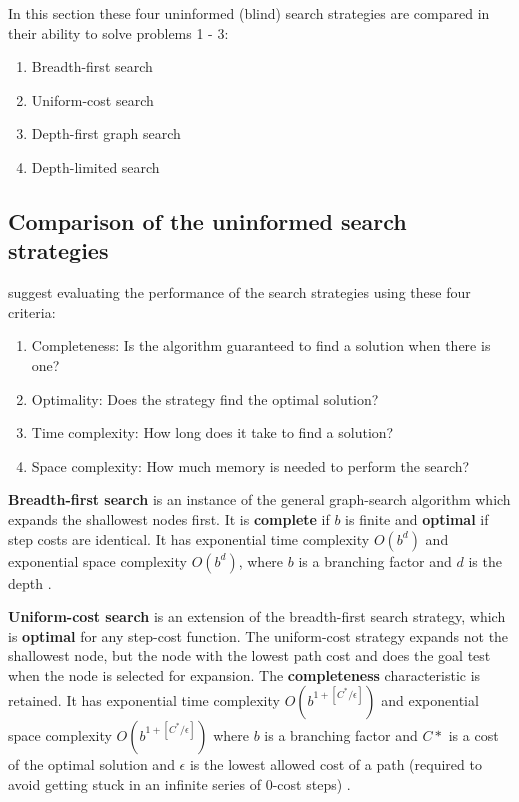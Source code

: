 \documentclass[11pt]{article}
\begin{document}
In this section these four uninformed (blind) search strategies are compared in their ability to solve problems 1 - 3:

\begin{enumerate}
  \item Breadth-first search
  \item Uniform-cost search
  \item Depth-first graph search
  \item Depth-limited search
\end{enumerate}

\subsection{Comparison of the uninformed search strategies}

\cite{russell2010artificial} suggest evaluating the performance of the search strategies using these four criteria:

\begin{enumerate}
  \item Completeness: Is the algorithm guaranteed to find a solution when there is one?
  \item Optimality: Does the strategy find the optimal solution?
  \item Time complexity: How long does it take to find a solution?
  \item Space complexity: How much memory is needed to perform the search?
\end{enumerate}

\textbf{Breadth-first search} is an instance of the general graph-search algorithm which expands the shallowest nodes first. It is \textbf{complete} if $b$ is finite and \textbf{optimal} if step costs are identical. It has exponential time complexity $O(b^d)$ and exponential space complexity $O(b^d)$, where $b$ is a branching factor and $d$ is the depth \autocite{russell2010artificial}.

\textbf{Uniform-cost search} is an extension of the breadth-first search strategy, which is \textbf{optimal} for any step-cost function. The uniform-cost strategy expands not the shallowest node, but the node with the lowest path cost and does the goal test when the node is selected for expansion. The \textbf{completeness} characteristic is retained. It has exponential time complexity $O(b^{1 + [C^* / \epsilon]})$ and exponential space complexity $O(b^{1 + [C^* / \epsilon]})$ where $b$ is a branching factor and $C*$ is a cost of the optimal solution and $\epsilon$ is the lowest allowed cost of a path (required to avoid getting stuck in an infinite series of 0-cost steps) \autocite{russell2010artificial}.
\end{document}
